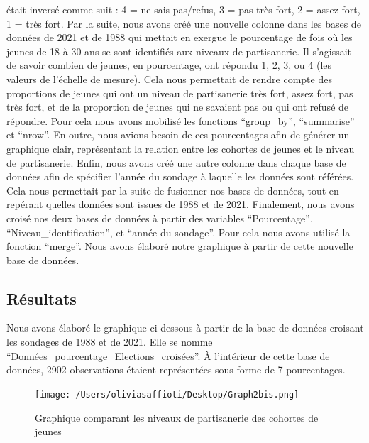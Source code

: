 \documentclass[
  letterpaper,
  DIV=11,
  numbers=noendperiod]{scrartcl}
\begin{document}
était inversé comme suit : 4 = ne sais pas/refus, 3 = pas très fort, 2 =
assez fort, 1 = très fort. Par la suite, nous avons créé une nouvelle
colonne dans les bases de données de 2021 et de 1988 qui mettait en
exergue le pourcentage de fois où les jeunes de 18 à 30 ans se sont
identifiés aux niveaux de partisanerie. Il s'agissait de savoir combien
de jeunes, en pourcentage, ont répondu 1, 2, 3, ou 4 (les valeurs de
l'échelle de mesure). Cela nous permettait de rendre compte des
proportions de jeunes qui ont un niveau de partisanerie très fort, assez
fort, pas très fort, et de la proportion de jeunes qui ne savaient pas
ou qui ont refusé de répondre. Pour cela nous avons mobilisé les
fonctions ``group\_by'', ``summarise'' et ``nrow''. En outre, nous
avions besoin de ces pourcentages afin de générer un graphique clair,
représentant la relation entre les cohortes de jeunes et le niveau de
partisanerie. Enfin, nous avons créé une autre colonne dans chaque base
de données afin de spécifier l'année du sondage à laquelle les données
sont référées. Cela nous permettait par la suite de fusionner nos bases
de données, tout en repérant quelles données sont issues de 1988 et de
2021. Finalement, nous avons croisé nos deux bases de données à partir
des variables ``Pourcentage'', ``Niveau\_identification'', et ``année du
sondage''. Pour cela nous avons utilisé la fonction ``merge''. Nous
avons élaboré notre graphique à partir de cette nouvelle base de
données.

\hypertarget{ruxe9sultats}{%
\subsection{Résultats}\label{ruxe9sultats}}

Nous avons élaboré le graphique ci-dessous à partir de la base de
données croisant les sondages de 1988 et de 2021. Elle se nomme
``Données\_pourcentage\_Elections\_croisées''. À l'intérieur de cette
base de données, 2902 observations étaient représentées sous forme de 7
pourcentages.

\begin{figure}

{\centering \texttt{[image: /Users/oliviasaffioti/Desktop/Graph2bis.png]}

}

\caption{Graphique comparant les niveaux de partisanerie des cohortes de
jeunes}

\end{figure}
\end{document}

